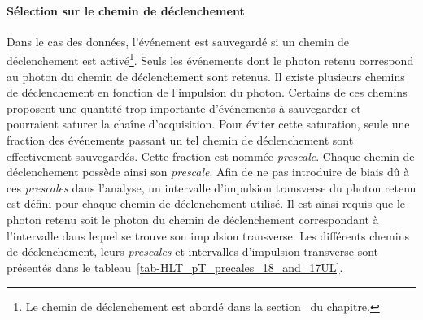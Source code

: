 \paragraph{Sélection sur le chemin de déclenchement}
Dans le cas des données, l'événement est sauvegardé si un chemin de déclenchement est activé\footnote{Le chemin de déclenchement est abordé dans la section~ du chapitre.}.
Seuls les événements dont le photon retenu correspond au photon du chemin de déclenchement sont retenus.
Il existe plusieurs chemins de déclenchement en fonction de l'impulsion du photon.
Certains de ces chemins proposent une quantité trop importante d'événements à sauvegarder et pourraient saturer la chaîne d'acquisition.
Pour éviter cette saturation, seule une fraction des événements passant un tel chemin de déclenchement sont effectivement sauvegardés.
Cette fraction est nommée \emph{prescale}.
Chaque chemin de déclenchement possède ainsi son \emph{prescale}.
Afin de ne pas introduire de biais dû à ces \emph{prescales} dans l'analyse, un intervalle d'impulsion transverse du photon retenu est défini pour chaque chemin de déclenchement utilisé.
Il est ainsi requis que le photon retenu soit le photon du chemin de déclenchement correspondant à l'intervalle dans lequel se trouve son impulsion transverse.
Les différents chemins de déclenchement, leurs \emph{prescales} et intervalles d'impulsion transverse sont présentés dans le tableau~\ref{tab-HLT_pT_precales_18_and_17UL}.
